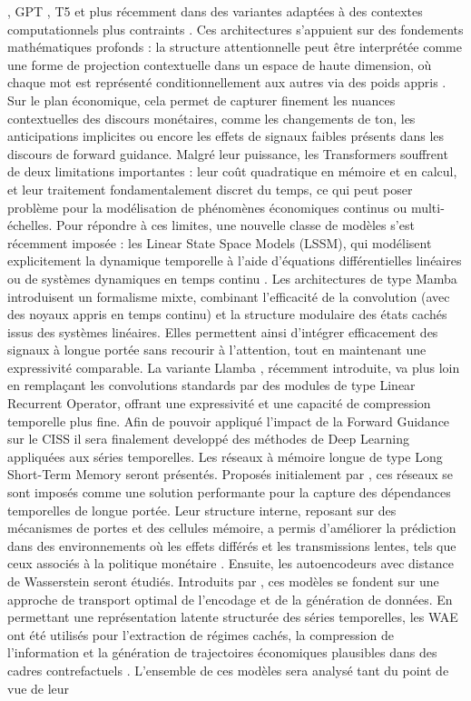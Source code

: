 \citep{devlin2018bert}, GPT \citep{radford2018gpt1, radford2019gpt2, brown2020gpt3}, T5 \citep{raffel2020t5} et plus récemment dans des variantes adaptées à des contextes computationnels plus contraints \citep{gu2022trainhippo, qin2023transnormerllm}. Ces architectures s’appuient sur des fondements mathématiques profonds : la structure attentionnelle peut être interprétée comme une forme de projection contextuelle dans un espace de haute dimension, où chaque mot est représenté conditionnellement aux autres via des poids appris \citep{cho2014learning}. Sur le plan économique, cela permet de capturer finement les nuances contextuelles des discours monétaires, comme les changements de ton, les anticipations implicites ou encore les effets de signaux faibles présents dans les discours de forward guidance. Malgré leur puissance, les Transformers souffrent de deux limitations importantes : leur coût quadratique en mémoire et en calcul, et leur traitement fondamentalement discret du temps, ce qui peut poser problème pour la modélisation de phénomènes économiques continus ou multi-échelles. Pour répondre à ces limites, une nouvelle classe de modèles s’est récemment imposée : les Linear State Space Models (LSSM), qui modélisent explicitement la dynamique temporelle à l’aide d’équations différentielles linéaires ou de systèmes dynamiques en temps continu \citep{gu2021combining, gu2023mamba}. Les architectures de type Mamba introduisent un formalisme mixte, combinant l’efficacité de la convolution (avec des noyaux appris en temps continu) et la structure modulaire des états cachés issus des systèmes linéaires. Elles permettent ainsi d’intégrer efficacement des signaux à longue portée sans recourir à l’attention, tout en maintenant une expressivité comparable. La variante Llamba \citep{bick2025llamba}, récemment introduite, va plus loin en remplaçant les convolutions standards par des modules de type Linear Recurrent Operator, offrant une expressivité et une capacité de compression temporelle plus fine. Afin de pouvoir appliqué l'impact de la Forward Guidance sur le CISS il sera finalement developpé des méthodes de Deep Learning appliquées aux séries temporelles. Les réseaux à mémoire longue de type Long Short-Term Memory seront présentés. Proposés initialement par \citep{hochreiter1997long}, ces réseaux se sont imposés comme une solution performante pour la capture des dépendances temporelles de longue portée. Leur structure interne, reposant sur des mécanismes de portes et des cellules mémoire, a permis d’améliorer la prédiction dans des environnements où les effets différés et les transmissions lentes, tels que ceux associés à la politique monétaire \citep{qin2023transnormerllm}. Ensuite, les autoencodeurs avec distance de Wasserstein seront étudiés. Introduits par \citep{tolstikhin2018wasserstein}, ces modèles se fondent sur une approche de transport optimal de l’encodage et de la génération de données. En permettant une représentation latente structurée des séries temporelles, les WAE ont été utilisés pour l’extraction de régimes cachés, la compression de l’information et la génération de trajectoires économiques plausibles dans des cadres contrefactuels \citep{chung2015recurrent, fraccaro2016sequential}.  L’ensemble de ces modèles sera analysé tant du point de vue de leur 